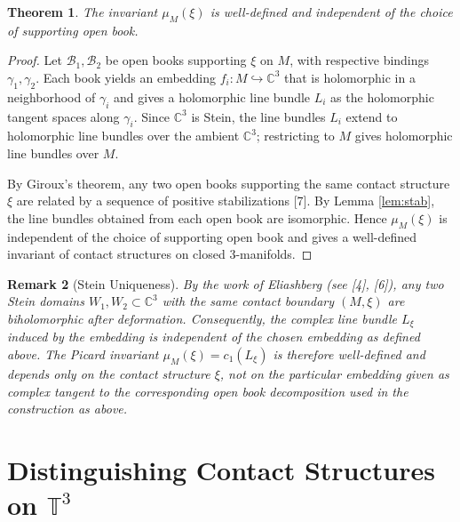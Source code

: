 \documentclass{amsart}
\newtheorem{theorem}{Theorem}
\newtheorem{remark}[theorem]{Remark}
\newcommand{\C}{\mathbb{C}}
\newcommand{\T}{\mathbb{T}}
\begin{document}
\begin{theorem}
The invariant $\mu_M(\xi)$ is well-defined and independent of the choice of supporting open book.
\end{theorem}

\begin{proof}
Let $\mathcal{B}_1, \mathcal{B}_2$ be open books supporting $\xi$ on $M$, with respective bindings $\gamma_1, \gamma_2$. Each book yields an embedding $f_i: M \hookrightarrow \C^3$ that is holomorphic in a neighborhood of $\gamma_i$ and gives a holomorphic line bundle $L_i$ as the holomorphic tangent spaces along $\gamma_i$. Since $\C^3$ is Stein, the line bundles $L_i$ extend to holomorphic line bundles over the ambient $\C^3$; restricting to $M$ gives holomorphic line bundles over $M$.

By Giroux's theorem, any two open books supporting the same contact structure $\xi$ are related by a sequence of positive stabilizations [7]. By Lemma \ref{lem:stab}, the line bundles obtained from each open book are isomorphic. Hence $\mu_M(\xi)$ is independent of the choice of supporting open book and gives a well-defined invariant of contact structures on closed 3-manifolds.
\end{proof}

\begin{remark}[Stein Uniqueness]
By the work of Eliashberg (see [4], [6]), any two Stein domains $W_1, W_2 \subset \mathbb{C}^3$ with the same contact boundary $(M,\xi)$ are biholomorphic after deformation. Consequently, the complex line bundle $L_\xi$ induced by the embedding is independent of the chosen embedding as defined above. The Picard invariant $\mu_M(\xi) = c_1(L_\xi)$ is therefore well-defined and depends only on the contact structure $\xi$, not on the particular embedding given as complex tangent to the corresponding open book decomposition used in the construction as above.
\end{remark}


\section{Distinguishing Contact Structures on $\T^3$}
\end{document}
